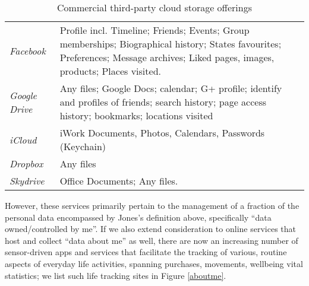 \documentclass[graybox]{svmult}
\begin{document}
\begin{table}
\begin{tabular}{p{2.2cm} p{7cm}}
\emph{Facebook} & Profile incl. Timeline; Friends; Events; Group memberships; Biographical history; States favourites; Preferences; Message archives; Liked pages, images, products; Places visited. \\

\emph{Google Drive} & Any files; Google Docs; calendar; G+ profile; identify and profiles of friends; search history; page access history; bookmarks; locations visited \\

\emph{iCloud} & iWork Documents, Photos, Calendars, Passwords (Keychain) \\
\emph{Dropbox} & Any files \\

\emph{Skydrive} & Office Documents; Any files. \\

\end{tabular}
\caption{Commercial third-party cloud storage offerings}
\label{fig:cloudstorage}
\end{table}

However, these services primarily pertain to the management of a fraction of the personal data encompassed by Jones's definition above, specifically ``data owned/controlled by me''.  If we also extend consideration to online services that host and collect ``data about me'' as well, there are now an increasing number of sensor-driven apps and services that facilitate the tracking of various, routine aspects of everyday life activities, spanning purchases, movements, wellbeing vital statistics; we list such life tracking sites in Figure \ref{aboutme}.
\end{document}
